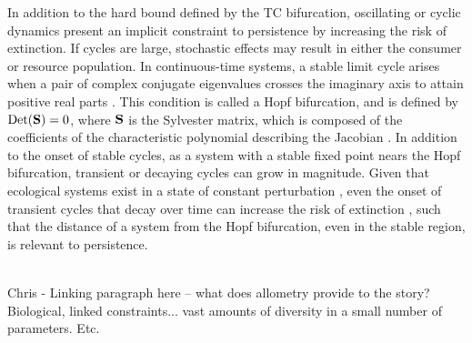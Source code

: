 \documentclass[12pt,english]{article}
\begin{document}
\begin{spacing}{1.9}
In addition to the hard bound defined by the TC bifurcation, oscillating or cyclic dynamics present an implicit constraint to persistence by increasing the risk of extinction.
If cycles are large, stochastic effects may result in either the consumer or resource population.
In continuous-time systems, a stable limit cycle arises when a pair of complex conjugate eigenvalues crosses the imaginary axis to attain positive real parts \citep{GuckHolmes}.
This condition is called a Hopf bifurcation, and is defined by ${\rm Det}({\bf S}) = 0$, where $\bf S$ is the Sylvester matrix, which is composed of the coefficients of the characteristic polynomial describing the Jacobian \citep{Gross:2004p2428}.
In addition to the onset of stable cycles, as a system with a stable fixed point nears the Hopf bifurcation, transient or decaying cycles can grow in magnitude.
Given that ecological systems exist in a state of constant perturbation \citep{Hastings:2001jh}, even the onset of transient cycles that decay over time can increase the risk of extinction \citep{Neubert:1997wk,Caswell:2005eo,Neubert:2009td}, such that the distance of a system from the Hopf bifurcation, even in the stable region, is relevant to persistence.






 \\ \nonumber
Chris - Linking paragraph here -- what does allometry provide to the story? Biological, linked constraints... vast amounts of diversity in a small number of parameters. Etc.




\end{spacing}
\end{document}
